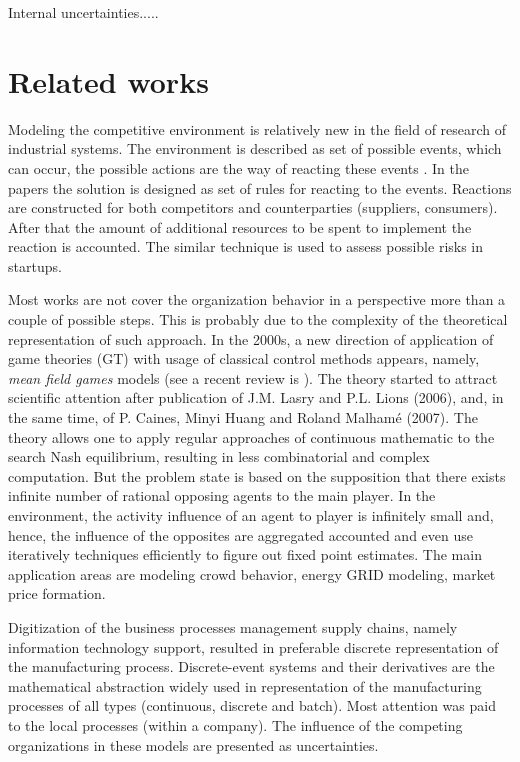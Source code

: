 \documentclass[runningheads]{llncs}
\begin{document}

Internal uncertainties.....

\section{Related works}
\label{sec:rel-works}

Modeling the competitive environment is relatively new in the field of research of industrial systems. The environment is described as set of possible events, which can occur, the possible actions are the way of reacting these events \cite{andres}. In the papers the solution is designed as set of rules for reacting to the events. Reactions are constructed for both competitors and counterparties (suppliers, consumers). After that the amount of additional resources to be spent to implement the reaction is accounted.  The similar technique is used to assess possible risks in startups.

Most works are not cover the organization behavior in a perspective more than a couple of possible steps. This is probably due to the complexity of the theoretical representation of such approach. In the 2000s, a new direction of application of game theories (GT) with usage of classical control methods appears, namely, \emph{mean field games} models (see a recent review is \cite{gomes}). The theory started to attract scientific attention after publication of J.M. Lasry and P.L. Lions (2006), and,  in the same time, of P. Caines, Minyi Huang and Roland Malhamé (2007). The theory allows one to apply regular approaches of continuous mathematic to the search Nash equilibrium, resulting in less combinatorial and complex computation. But the problem state is based on the supposition that there exists infinite number of rational opposing agents to the main player. In the environment, the activity influence of an agent to player is infinitely small and, hence, the influence of the opposites are aggregated accounted and even use iteratively techniques efficiently to figure out fixed point estimates. The main application areas are modeling crowd behavior, energy GRID modeling, market price formation.

Digitization of the business processes management supply chains, namely information technology support, resulted in preferable discrete representation of the manufacturing process. Discrete-event systems and their derivatives are the mathematical abstraction widely used in representation of the manufacturing processes of all types (continuous, discrete and batch). Most attention was paid to the local processes (within a company). The influence of the competing organizations in these models are presented as uncertainties.
\end{document}
